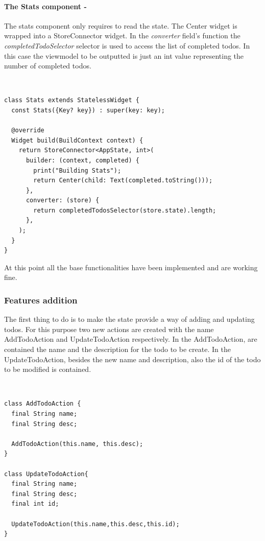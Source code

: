 \paragraph{The Stats component - }
\label{subpar:todo_app_bloc_core_state}
The stats component only requires to read the state. The Center widget is wrapped into a StoreConnector widget. In the \textit{converter} field's function the \textit{completedTodoSelector} selector is used to access the list of completed todos. In this case the viewmodel to be outputted is just an int value representing the number of completed todos.
\begin{code}
\mbox{}\\
 \mbox{}
		\label{code:2.14}
\begin{verbatim}
class Stats extends StatelessWidget {
  const Stats({Key? key}) : super(key: key);

  @override
  Widget build(BuildContext context) {
    return StoreConnector<AppState, int>(
      builder: (context, completed) {
        print("Building Stats");
        return Center(child: Text(completed.toString()));
      },
      converter: (store) {
        return completedTodosSelector(store.state).length;
      },
    );
  }
}
\end{verbatim}
\mbox{}
\end{code}

At this point all the base functionalities have been implemented and are working fine.
 

\subsubsection{Features addition}  \label{par:todo_app_inherited_widget_introduction}

The first thing to do is to make the state provide a way of adding and updating todos. For this purpose two new actions are created with the name AddTodoAction and UpdateTodoAction respectively. In the AddTodoAction, are contained the name and the description for the todo to be create. In the UpdateTodoAction, besides the new name and description, also the id of the todo to be modified is contained.
\begin{code}
\mbox{}\\
 \mbox{}
		\label{code:2.14}
\begin{verbatim}
class AddTodoAction {
  final String name;
  final String desc;

  AddTodoAction(this.name, this.desc);
}

class UpdateTodoAction{
  final String name;
  final String desc;
  final int id;

  UpdateTodoAction(this.name,this.desc,this.id);
}
\end{verbatim}
\mbox{}
\end{code}


